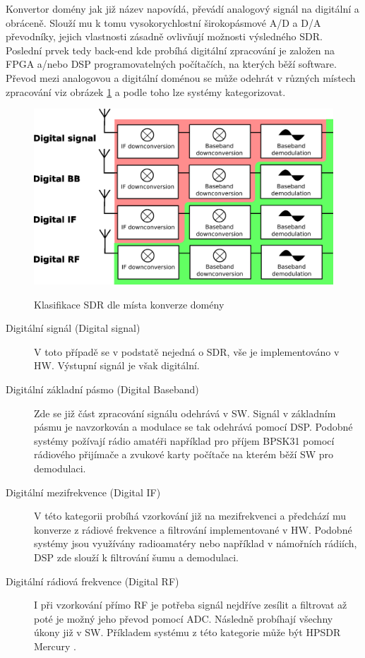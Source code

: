 \documentclass{ctuthesis}
\begin{document}
Konvertor domény jak již název napovídá, převádí analogový signál na digitální a obráceně. Slouží mu k tomu vysokorychlostní širokopásmové A/D a D/A převodníky, jejich vlastnosti zásadně ovlivňují možnosti výsledného SDR. \\
 Poslední prvek tedy back-end kde probíhá digitální zpracování je založen na FPGA a/nebo DSP programovatelných počítačích, na kterých běží software.\\
Převod mezi analogovou a digitální doménou se může odehrát v různých místech zpracování viz obrázek  \ref{SDRconversion} a podle toho lze systémy kategorizovat.
\begin{figure}
\caption{Klasifikace SDR dle místa konverze domény\cite{andrasretzler2014}}
\includegraphics[width=1\textwidth]{./images/SDRconversion.png}
\label{SDRconversion}
\end{figure}
\begin{description}
\item[Digitální signál (Digital signal)]
V toto případě se v podstatě nejedná o SDR, vše je implementováno v HW. Výstupní signál je však digitální.
\item[Digitální základní pásmo (Digital Baseband)]
Zde se již část zpracování signálu odehrává v SW. Signál v základním pásmu je navzorkován a modulace se tak odehrává pomocí DSP. Podobné systémy požívají rádio amatéři například pro příjem BPSK31 pomocí rádiového přijímače a zvukové karty počítače na kterém běží SW pro demodulaci.
\item[Digitální mezifrekvence (Digital IF)]
V této kategorii probíhá vzorkování již na mezifrekvenci a předchází mu konverze z rádiové frekvence a filtrování implementované v HW. Podobné systémy jsou využívány radioamatéry nebo například v námořních rádiích, DSP zde slouží k filtrování šumu a demodulaci. 
\item[Digitální rádiová frekvence (Digital RF)]
I při vzorkování přímo RF je potřeba signál nejdříve zesílit a filtrovat až poté je možný jeho převod pomocí ADC. Následně probíhají všechny úkony již v SW. Příkladem systému z této kategorie může být HPSDR Mercury \cite{tapr} .
\end{description}
\end{document}
